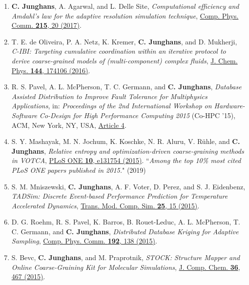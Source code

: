 \documentclass{article}
\begin{document}
\begin{enumerate}
\item[26.] \textbf{C. Junghans}, A. Agarwal, and L. Delle Site,
  \textit{Computational efficiency and Amdahl’s law for the adaptive resolution simulation technique},
  \href{http://dx.doi.org/10.1016/j.cpc.2017.01.030}{Comp. Phys. Comm. \textbf{215}, 20 (2017)}.

\item[25.] T. E. de Oliveira, P. A. Netz, K. Kremer, \textbf{C. Junghans}, and D. Mukherji,
  \textit{C-IBI: Targeting cumulative coordination within an iterative protocol to derive coarse-grained models of (multi-component) complex fluids},
  \href{http://dx.doi.org/10.1063/1.4947253}{J. Chem. Phys. \textbf{144}, 174106 (2016)}.

\item[24.] R. S. Pavel, A. L. McPherson, T. C. Germann, and \textbf{C. Junghans},
  \textit{Database Assisted Distribution to Improve Fault Tolerance for Multiphysics Applications},
  in: \textit{Proceedings of the 2nd International Workshop on Hardware-Software Co-Design for High Performance Computing 2015} (Co-HPC '15),
  ACM, New York, NY, USA, \href{http://dx.doi.org/10.1145/2834899.2834908}{Article 4}.

\item[23.] S. Y. Mashayak, M. N. Jochum, K. Koschke, N. R. Aluru, V. R{\"u}hle, and \textbf{C. Junghans},
  \textit{Relative entropy and optimization-driven coarse-graining methods in VOTCA},
  \href{http://dx.doi.org/10.1371/journal.pone.0131754}{PLoS ONE \textbf{10}, e131754 (2015)}.
   ``\emph{Among the top 10\% most cited PLoS ONE papers published in 2015.}" (2019)

\item[22.] S. M. Mniszewski, \textbf{C. Junghans}, A. F. Voter, D. Perez, and S. J. Eidenbenz,
  \textit{TADSim: Discrete Event-based Performance Prediction for Temperature Accelerated Dynamics},
  \href{http://dx.doi.org/10.1145/2699715}{Trans. Mod. Comp. Sim.  \textbf{25}, 15 (2015)}.

\item[21.] D. G. Roehm, R. S. Pavel, K. Barros, B. Rouet-Leduc, A. L. McPherson, T. C. Germann, and \textbf{C. Junghans},
  \textit{Distributed Database Kriging for Adaptive Sampling},
  \href{http://dx.doi.org/10.1016/j.cpc.2015.03.006}{Comp. Phys. Comm. \textbf{192}, 138 (2015)}.

\item[20.] S. Bevc, \textbf{C. Junghans}, and M. Praprotnik,
  \textit{STOCK: Structure Mapper and Online Coarse-Graining Kit for Molecular Simulations},
  \href{http://dx.doi.org/10.1002/jcc.23806}{J. Comp. Chem. \textbf{36}, 467 (2015)}.


\end{enumerate}
\end{document}
